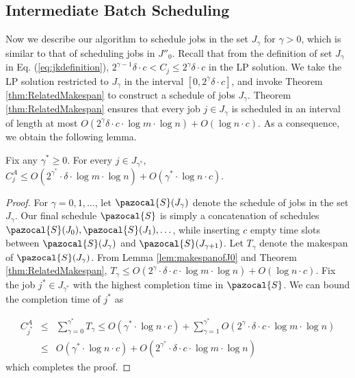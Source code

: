   \subsection{Intermediate Batch Scheduling}
  \label{sec:nextbatch}
  Now we describe our algorithm to schedule jobs in the set $J_\gamma$ for $\gamma > 0$, which is  similar to that of scheduling jobs in $J''_0$.
  Recall that from the definition of set $J_\gamma$ in Eq. (\ref{eq:jkdefinition}), $2^{\gamma-1} \delta \cdot c  < C_j \leq  2^\gamma \delta \cdot c$ in the LP solution.
  We take the LP solution restricted to $J_\gamma$ in the interval $[0, 2^\gamma \delta \cdot c]$, and  invoke Theorem \ref{thm:RelatedMakespan} to construct a schedule of jobs $J_\gamma$.
  Theorem \ref{thm:RelatedMakespan} ensures that every job  $j \in J_\gamma$  is scheduled in an interval of length at most $O(2^\gamma \delta \cdot c \cdot \log m \cdot \log n) + O(\log n \cdot c)$. 
  As a consequence, we obtain the following lemma.
  \begin{lemma}
  \label{lem:intermediate}
  Fix any $\gamma^* \geq 0$. For every $j \in J_{\gamma^*}$, $C^A_j \leq O(2^{\gamma^*} \cdot \delta \cdot \log m \cdot \log n) + O(\gamma^* \cdot \log n \cdot c)$.
  \end{lemma}
  \begin{proof} 
  For $\gamma = 0, 1, \ldots$, let $\pazocal{S}(J_\gamma)$ denote the schedule of jobs in the set $J_\gamma$.
  Our final schedule $\pazocal{S}$ is simply a concatenation of schedules $\pazocal{S}(J_0), \pazocal{S}(J_1), \ldots$, while inserting $c$ empty time slots between  $\pazocal{S}(J_\gamma)$ and $ \pazocal{S}(J_{\gamma+1})$.
  Let $T_{\gamma}$ denote the makespan of $\pazocal{S}(J_\gamma)$.
  From Lemma \ref{lem:makespanofJ0} and Theorem \ref{thm:RelatedMakespan}, $T_{\gamma} \leq O(2^\gamma \cdot  \delta \cdot c \cdot \log m \cdot \log n ) + O(\log n \cdot c)$.
  Fix the job $j^* \in J_{\gamma^*}$ with the highest completion time in $\pazocal{S}$.
  We can bound the completion time of $j^*$ as
  
  \begin{eqnarray*}
  C^A_{j^*} &\leq& \sum^{\gamma^*}_{\gamma = 0} T_{\gamma} \leq  O(\gamma^* \cdot \log n \cdot c) + \sum^{\gamma^*}_{\gamma = 1} O(2^\gamma \cdot \delta \cdot c \cdot \log m \cdot \log n) \\
  &\leq& O(\gamma^* \cdot \log n \cdot c) + O(2^{\gamma^*} \cdot \delta \cdot c \cdot \log m \cdot \log n)
  \end{eqnarray*}
  which completes the proof.
  \end{proof}
  
